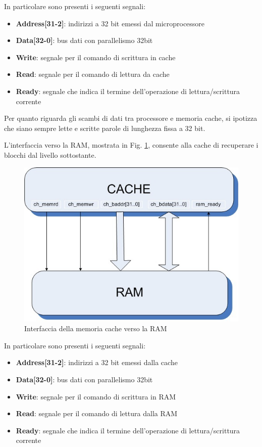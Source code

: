 In particolare sono presenti i seguenti segnali:
\begin{itemize} %
\item \textbf{Address[31-2]}: indirizzi a 32 bit emessi dal microprocessore
\item \textbf{Data[32-0]}: bus dati con parallelismo 32bit 
\item \textbf{Write}: segnale per il comando di scrittura in cache
\item \textbf{Read}: segnale per il comando di lettura da cache
\item \textbf{Ready}: segnale che indica il termine dell'operazione di lettura/scrittura corrente
\end{itemize}

Per quanto riguarda gli scambi di dati tra processore e memoria cache, si ipotizza che siano sempre lette e scritte parole di lunghezza fissa a 32 bit.

L'interfaccia verso la RAM, mostrata in Fig. \ref{fig:int_ram}, consente alla cache di recuperare i blocchi dal livello sottostante.

\begin{figure}[!h]
\centering
\includegraphics[width=\textwidth]{img/cache-ram.jpg}
\caption{Interfaccia della memoria cache verso la RAM}
\label{fig:int_ram}
\end{figure}

In particolare sono presenti i seguenti segnali:
\begin{itemize} %
\item \textbf{Address[31-2]}: indirizzi a 32 bit emessi dalla cache
\item \textbf{Data[32-0]}: bus dati con parallelismo 32bit 
\item \textbf{Write}: segnale per il comando di scrittura in RAM
\item \textbf{Read}: segnale per il comando di lettura dalla RAM
\item \textbf{Ready}: segnale che indica il termine dell'operazione di lettura/scrittura corrente
\end{itemize}

